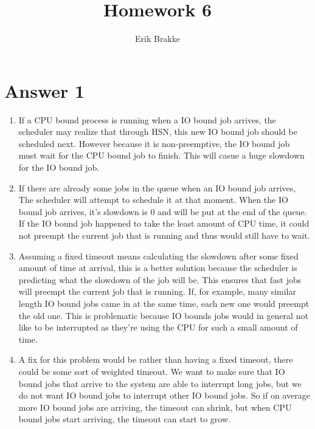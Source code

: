 \documentclass[11pt]{article}
\theoremstyle{definition}
\begin{document}
\title{Homework 6}
\author{Erik Brakke}
\maketitle

\thispagestyle{fancy}
 
 
\section*{Answer 1}
\begin{enumerate}
	\item If a CPU bound process is running when a IO bound job arrives, the scheduler may realize that through HSN, this new IO bound job should be scheduled next.  However because it is non-preemptive,
	the IO bound job must wait for the CPU bound job to finish. This will casue a huge slowdown for the IO bound job.

	\item If there are already some jobs in the queue when an IO bound job arrives, The scheduler will attempt to schedule it at that moment.  When the IO bound job arrives, it's slowdown is 0 and will be put at the end of the queue.  If the IO bound job happened to take the least amount of CPU time, it could not preempt the current job that is running and thus would still have to wait.

	\item Assuming a fixed timeout means calculating the slowdown after some fixed amount of time at arrival, this is a better solution because the scheduler is predicting what the slowdown of the job will be.
	This ensures that fast jobs will preempt the current job that is running.  If, for example, many similar length IO bound jobs came in at the same time, each new one would preempt the old one.  This is problematic because IO bounds jobs would in general not like to be interrupted as they're using the CPU for such a small amount of time.

	\item A fix for this problem would be rather than having a fixed timeout, there could be some sort of weighted timeout.  We want to make sure that IO bound jobs that arrive to the system are able to interrupt long jobs, but we do not want IO bound jobs to interrupt other IO bound jobs. So if on average more IO bound jobs are arriving, the timeout can shrink, but when CPU bound jobs start arriving, the timeout can start to grow.
\end{enumerate}
\end{document}
